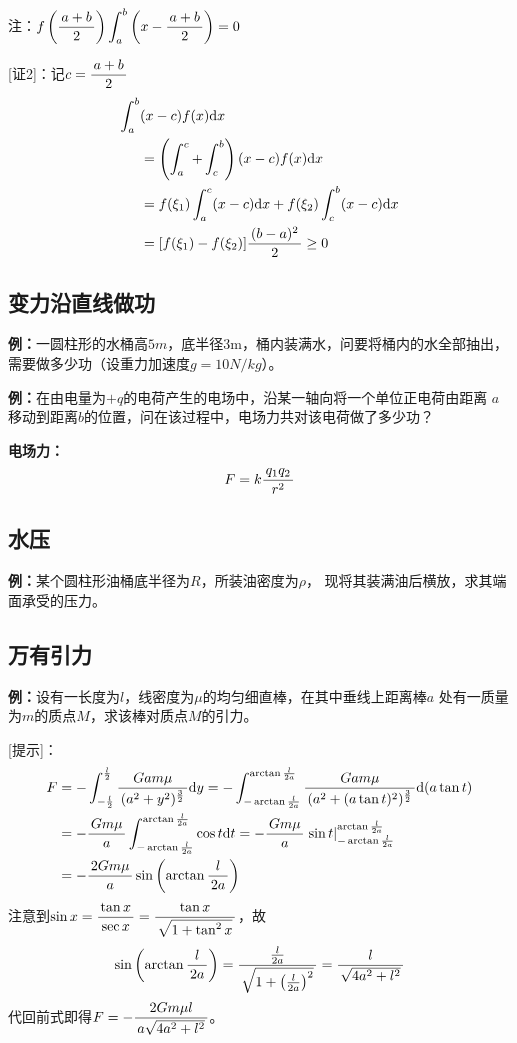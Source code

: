 注：$f\left(\displaystyle\frac{\,{a+b}\,}{\,{2}\,}\right)\displaystyle\int_a^b\left(x-\displaystyle\frac{\,{a+b}\,}{\,{2}\,}\right)=0$

[证2]：记$c=\displaystyle\frac{\,{a+b}\,}{\,{2}\,}$
\begin{align}
	\displaystyle\int_a^b&(x-c)f(x)\mathrm{d} x\notag\\
	&=\left(\displaystyle\int_a^c+\displaystyle\int_c^b\right)(x-c)f(x)\mathrm{d} x\notag\\
	&=f(\xi_1)\displaystyle\int_a^c(x-c)\mathrm{d} x+f(\xi_2)\displaystyle\int_c^b(x-c)\mathrm{d} x\notag\\
	&=[f(\xi_1)-f(\xi_2)]\displaystyle\frac{\,{(b-a)^2}\,}{\,{2}\,}\geq0\notag
\end{align}
\fin

\subsection{变力沿直线做功}

{\bf 例：}一圆柱形的水桶高$5m$，底半径$3$m，桶内装满水，问要将桶内的水全部抽出，
需要做多少功（设重力加速度$g=10N/kg$）。

{\bf 例：}在由电量为$+q$的电荷产生的电场中，沿某一轴向将一个单位正电荷由距离
$a$移动到距离$b$的位置，问在该过程中，电场力共对该电荷做了多少功？

{\bf 电场力：}
$$F=k\displaystyle\frac{\,{q_1q_2}\,}{\,{r^2}\,}$$

\subsection{水压}

{\bf 例：}某个圆柱形油桶底半径为$R$，所装油密度为$\rho$，
现将其装满油后横放，求其端面承受的压力。

\subsection{万有引力}

{\bf 例：}设有一长度为$l$，线密度为$\mu$的均匀细直棒，在其中垂线上距离棒$a$
处有一质量为$m$的质点$M$，求该棒对质点$M$的引力。

[提示]：
\begin{align}
	F&=-\displaystyle\int_{-\frac l2}^{\frac l2}\displaystyle\frac{\,{Gam\mu}\,}{\,{(a^2+y^2)^{\frac32}}\,}\mathrm{d} y
	=-\displaystyle\int_{-\arctan\frac l{2a}}^{\arctan\frac l{2a}}\displaystyle\frac{\,{Gam\mu}\,}{\,{(a^2+(a\tan
	t)^2)^{\frac32}}\,}\mathrm{d} (a\tan t)\notag\\
	&=-\displaystyle\frac{\,{Gm\mu}\,}{\,{a}\,}\displaystyle\int_{-\arctan\frac l{2a}}^{\arctan\frac
	l{2a}}\cos t\mathrm{d} t=-\displaystyle\frac{\,{Gm\mu}\,}{\,{a}\,}\left.\sin t\right|_{-\arctan\frac
	l{2a}}^{\arctan\frac l{2a}}\notag\\
	&=-\displaystyle\frac{\,{2Gm\mu}\,}{\,{a}\,}\sin\left(\arctan\displaystyle\frac{\,{l}\,}{\,{2a}\,}\right)\notag
\end{align}
注意到$\sin x=\displaystyle\frac{\,{\tan x}\,}{\,{\sec x}\,}=\displaystyle\frac{\,{\tan x}\,}{\,{\sqrt{1+\tan^2 x}}\,}$，故
$$\sin\left(\arctan\displaystyle\frac{\,{l}\,}{\,{2a}\,}\right)=\displaystyle\frac{\,{\frac{l}{2a}}\,}{\,{\sqrt{1+\left(\frac{l}{2a}\right)^2}}\,}=\displaystyle\frac{\,{l}\,}{\,{\sqrt{4a^2+l^2}}\,}$$
代回前式即得$F=-\displaystyle\frac{\,{2Gm\mu l}\,}{\,{a\sqrt{4a^2+l^2}}\,}$。

